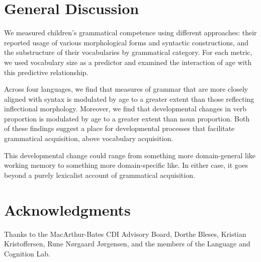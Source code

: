 \documentclass[10pt,letterpaper]{article}
\begin{document}
\section{General Discussion}

We measured children's grammatical competence using different approaches: their reported usage of various morphological forms and syntactic constructions, and the substructure of their vocabularies by grammatical category. For each metric, we used vocabulary size as a predictor and examined the interaction of age with this predictive relationship.

Across four languages, we find that measures of grammar that are more closely aligned with syntax is modulated by age to a greater extent than those reflecting inflectional morphology.  Moreover, we find that  developmental changes in verb proportion is modulated by age to a greater extent than noun proportion. Both of these findings suggest a place for developmental processes that facilitate grammatical acquisition, above vocabulary acquisition. 

This developmental change could range from something more domain-general like working memory to something more domain-specific like. In either case, it goes beyond a purely lexicalist account of grammatical acquisition.

\section{Acknowledgments}

Thanks to the MacArthur-Bates CDI Advisory Board, Dorthe Bleses, Kristian Kristoffersen, Rune N\o rgaard J\o rgensen, and the members of the Language and Cognition Lab. 



\setlength{\bibleftmargin}{.125in}
\setlength{\bibindent}{-\bibleftmargin}


\end{document}
